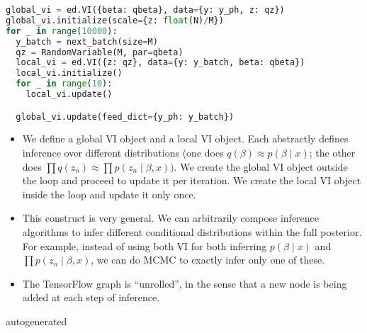 \begin{lstlisting}[language=Python]
global_vi = ed.VI({beta: qbeta}, data={y: y_ph, z: qz})
global_vi.initialize(scale={z: float(N)/M})
for _ in range(10000):
  y_batch = next_batch(size=M)
  qz = RandomVariable(M, par=qbeta)
  local_vi = ed.VI({z: qz}, data={y: y_batch, beta: qbeta})
  local_vi.initialize()
  for _ in range(10):
    local_vi.update()

  global_vi.update(feed_dict={y_ph: y_batch})
\end{lstlisting}
\begin{itemize}
\item
  We define a global VI object and a local VI object. Each abstractly
  defines inference over different distributions (one does $q(\beta)
  \approx p(\beta \mid x)$; the other does $\prod q(z_n) \approx \prod
  p(z_n \mid \beta, x))$. We create the global VI object outside the loop
  and proceed to update it per iteration. We create the local VI
  object inside the loop and update it only once.
\item
  This construct is very general. We can arbitrarily compose inference
  algorithms to infer different conditional distributions within the
  full posterior. For example, instead of using both VI for both
  inferring $p(\beta \mid x)$ and $\prod p(z_n \mid \beta, x)$, we can do
  MCMC to exactly infer only one of these.
\item
  The TensorFlow graph is ``unrolled'', in the sense that a new node is
  being added at each step of inference.
\end{itemize}

{{autogenerated}}
